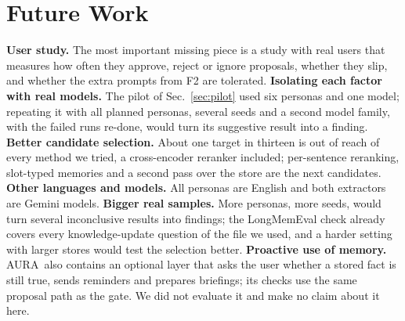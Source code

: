 \IfFileExists{IEEEtran.cls}{\documentclass[journal]{IEEEtran}\def\HAVEIEEE{1}}{\documentclass[10pt,twocolumn]{article}\usepackage[margin=0.7in,columnsep=0.25in]{geometry}}
\newcommand{\aura}{AURA}
\begin{document}
\section{Future Work}
\label{sec:future}
\textbf{User study.} The most important missing piece is a study with real users that measures how often they approve, reject or ignore proposals, whether they slip, and whether the extra prompts from F2 are tolerated. \textbf{Isolating each factor with real models.} The pilot of Sec.~\ref{sec:pilot} used six personas and one model; repeating it with all planned personas, several seeds and a second model family, with the failed runs re-done, would turn its suggestive result into a finding. \textbf{Better candidate selection.} About one target in thirteen is out of reach of every method we tried, a cross-encoder reranker included; per-sentence reranking, slot-typed memories and a second pass over the store are the next candidates. \textbf{Other languages and models.} All personas are English and both extractors are Gemini models. \textbf{Bigger real samples.} More personas, more seeds, would turn several inconclusive results into findings; the LongMemEval check already covers every knowledge-update question of the file we used, and a harder setting with larger stores would test the selection better. \textbf{Proactive use of memory.} \aura\ also contains an optional layer that asks the user whether a stored fact is still true, sends reminders and prepares briefings; its checks use the same proposal path as the gate. We did not evaluate it and make no claim about it here.
\end{document}
